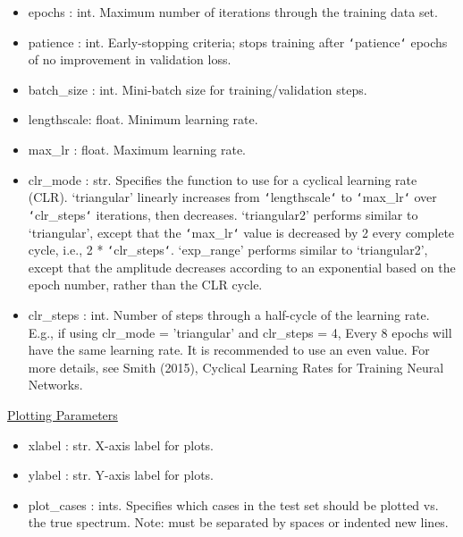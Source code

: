 \documentclass[letterpaper, 12pt]{article}
\begin{document}
\begin{itemize}
\item epochs     : int.  Maximum number of iterations through the training 
                         data set.
\item patience   : int.  Early-stopping criteria; stops training after 
                         \texttt{`}patience\texttt{`} epochs of no improvement 
                         in validation loss.
\item batch\_size : int.  Mini-batch size for training/validation steps.

\item lengthscale: float. Minimum learning rate.
\item max\_lr     : float. Maximum learning rate.
\item clr\_mode   : str.   Specifies the function to use for a cyclical 
                    learning rate (CLR).
                    `triangular' linearly increases from 
                    \texttt{`}lengthscale\texttt{`} to 
                    \texttt{`}max\_lr\texttt{`} over 
                    \texttt{`}clr\_steps\texttt{`} iterations, then decreases.
                    `triangular2' performs similar to `triangular', except that 
                    the \texttt{`}max\_lr\texttt{`} value is decreased by 2 
                    every complete cycle, i.e., 2 * 
                    \texttt{`}clr\_steps\texttt{`}.
                    `exp\_range' performs similar to `triangular2', except that 
                    the amplitude decreases according to an exponential based 
                    on the epoch number, rather than the CLR cycle.
\item clr\_steps  : int.   Number of steps through a half-cycle of the learning 
                           rate.
                    E.g., if using clr\_mode = 'triangular' and clr\_steps = 4, 
                    Every 8 epochs will have the same learning rate.
                    It is recommended to use an even value.
                    For more details, see Smith (2015), Cyclical Learning Rates 
                    for Training Neural Networks.
\end{itemize}

\noindent \underline{Plotting Parameters}
\begin{itemize}
\item xlabel : str.  X-axis label for plots.
\item ylabel : str.  Y-axis label for plots.
\item plot\_cases : ints. Specifies which cases in the test set should be 
                   plotted vs. the true spectrum.
                   Note: must be separated by spaces or indented new lines.
\end{itemize}
\end{document}

